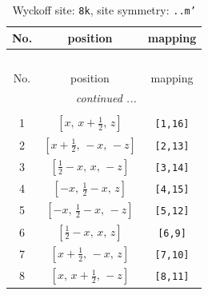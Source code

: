 \documentclass[fleqn,8pt]{jsarticle}
\begin{document}
\begin{longtable}{ccc}
\caption{Wyckoff site: {\tt 8k}, site symmetry: {\tt ..m'}}
 \\
 \hline \hline
No. & position & mapping \\ \hline \endfirsthead

\multicolumn{2}{l}{\tablename\ \thetable{}} \\
 \hline \hline
No. & position & mapping \\ \hline \endhead

 \hline \hline
\multicolumn{2}{r}{\footnotesize\it continued ...} \\ \endfoot

 \hline \hline
\multicolumn{2}{r}{} \\ \endlastfoot

1 & $\left[ x,\, x + \frac{1}{2},\, z \right]$ & {\tt [1,16]} \\ \hline
2 & $\left[ x + \frac{1}{2},\, - x,\, - z \right]$ & {\tt [2,13]} \\ \hline
3 & $\left[ \frac{1}{2} - x,\, x,\, - z \right]$ & {\tt [3,14]} \\ \hline
4 & $\left[ - x,\, \frac{1}{2} - x,\, z \right]$ & {\tt [4,15]} \\ \hline
5 & $\left[ - x,\, \frac{1}{2} - x,\, - z \right]$ & {\tt [5,12]} \\ \hline
6 & $\left[ \frac{1}{2} - x,\, x,\, z \right]$ & {\tt [6,9]} \\ \hline
7 & $\left[ x + \frac{1}{2},\, - x,\, z \right]$ & {\tt [7,10]} \\ \hline
8 & $\left[ x,\, x + \frac{1}{2},\, - z \right]$ & {\tt [8,11]} \\
\end{longtable}
\renewcommand{\arraystretch}{1.2}
\end{document}
